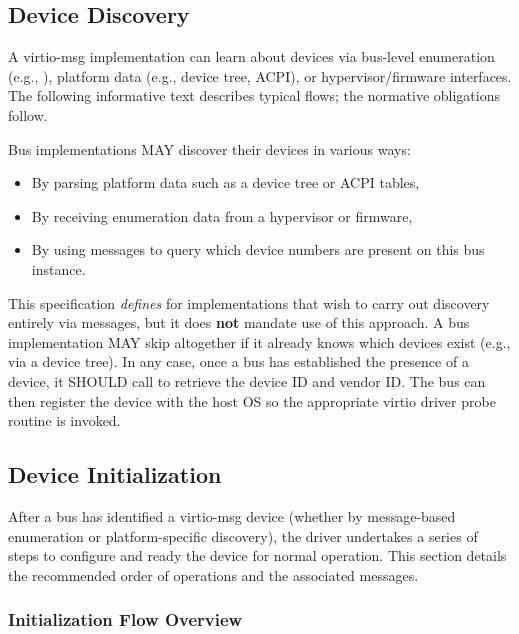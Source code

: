 \subsection{Device Discovery}\label{sec:Virtio Transport Options / Virtio Over Messages / Device Discovery}

A virtio-msg implementation can learn about devices via bus-level enumeration
(e.g., ), platform data (e.g., device tree, ACPI), or
hypervisor/firmware interfaces. The following informative text describes
typical flows; the normative obligations follow.

Bus implementations MAY discover their devices in various ways:
\begin{itemize}
  \item By parsing platform data such as a device tree or ACPI tables,
  \item By receiving enumeration data from a hypervisor or firmware,
  \item By using  messages
    to query which device numbers are present on this bus instance.
\end{itemize}

This specification \emph{defines}  for implementations that
wish to carry out discovery entirely via messages, but it does \textbf{not}
mandate use of this approach. A bus implementation MAY skip
 altogether if it already knows which devices exist (e.g.,
via a device tree). In any case, once a bus has established the presence of a
device, it SHOULD call  to retrieve the device ID
and vendor ID. The bus can then register the device with the host OS
so the appropriate virtio driver probe routine is invoked.

\subsection{Device Initialization}
\label{sec:Virtio Transport Options / Virtio Over Messages / Device Initialization}

After a bus has identified a virtio-msg device (whether by message-based
enumeration or platform-specific discovery), the driver undertakes a series of
steps to configure and ready the device for normal operation. This section
details the recommended order of operations and the associated messages.

\subsubsection{Initialization Flow Overview}
\label{sec:Virtio Transport Options / Virtio Over Messages / Device Initialization / Overview}

